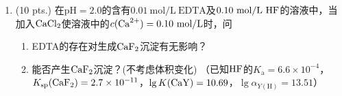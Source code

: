 \begin{enumerate}[label=\arabic*., itemsep=1.5ex]
    \item (10 pts.) 在$\mathrm{pH}=2.0$的含有$0.01\ \mathrm{mol/L}\ \mathrm{EDTA}$及$0.10\ \mathrm{mol/L}\ \ce{HF}$的溶液中，当加入$\ce{CaCl2}$使溶液中的$c(\ce{Ca^{2+}})=0.10\ \mathrm{mol/L}$时，问
    \begin{enumerate}[label=(\arabic*), noitemsep, topsep=0pt, partopsep=0pt]
        \item EDTA的存在对生成$\ce{CaF2}$沉淀有无影响？
        \item 能否产生$\ce{CaF2}$沉淀？(不考虑体积变化) （已知$\ce{HF}$的$K_\mathrm{a}=6.6\times10^{-4}$，$K_{\mathrm{sp}}(\ce{CaF2})=2.7\times10^{-11}$，$\lg K(\ce{CaY})=10.69$，$\lg\alpha_{Y(\mathrm{H})}=13.51$）
    \end{enumerate}
\end{enumerate}